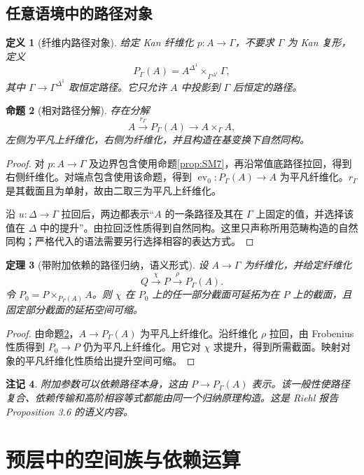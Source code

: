 \documentclass[12pt,oneside,openany,fontset=none]{ctexbook}
\theoremstyle{cn}
\newtheorem{definition}{定义}[chapter]
\newtheorem{proposition}[definition]{命题}
\newtheorem{theorem}[definition]{定理}
\newtheorem{remark}[definition]{注记}
\numberwithin{equation}{chapter}
\newcommand{\ev}{\operatorname{ev}}
\begin{document}
\section{任意语境中的路径对象}
\begin{definition}[纤维内路径对象]
给定 Kan 纤维化 $p:A\to\Gamma$，不要求 $\Gamma$ 为 Kan 复形，定义
\[
P_\Gamma(A)=A^{\Delta^1}\times_{\Gamma^{\Delta^1}}\Gamma,
\]
其中 $\Gamma\to\Gamma^{\Delta^1}$ 取恒定路径。它只允许 $A$ 中投影到 $\Gamma$ 后恒定的路径。
\end{definition}
\begin{proposition}[相对路径分解]\label{prop:relativepath}
存在分解
\[
A\xrightarrow{r_\Gamma}P_\Gamma(A)
\longrightarrow A\times_\Gamma A,
\]
左侧为平凡上纤维化，右侧为纤维化，并且构造在基变换下自然同构。
\end{proposition}
\begin{proof}
对 $p:A\to\Gamma$ 及边界包含使用命题\ref{prop:SM7}，再沿常值底路径拉回，得到右侧纤维化。对端点包含使用该命题，得到 $\ev_0:P_\Gamma(A)\to A$ 为平凡纤维化。$r_\Gamma$ 是其截面且为单射，故由二取三为平凡上纤维化。

沿 $u:\Delta\to\Gamma$ 拉回后，两边都表示“$A$ 的一条路径及其在 $\Gamma$ 上固定的值，并选择该值在 $\Delta$ 中的提升”。由拉回泛性质得到自然同构。这里只声称所用范畴构造的自然同构；严格代入的语法需要另行选择相容的表达方式。
\end{proof}
\begin{theorem}[带附加依赖的路径归纳，语义形式]
设 $A\to\Gamma$ 为纤维化，并给定纤维化
\[
Q\xrightarrow\chi P\xrightarrow\rho P_\Gamma(A).
\]
令 $P_0=P\times_{P_\Gamma(A)}A$。则 $\chi$ 在 $P_0$ 上的任一部分截面可延拓为在 $P$ 上的截面，且固定部分截面的延拓空间可缩。
\end{theorem}
\begin{proof}
由命题\ref{prop:relativepath}，$A\to P_\Gamma(A)$ 为平凡上纤维化。沿纤维化 $\rho$ 拉回，由 Frobenius 性质得到 $P_0\to P$ 仍为平凡上纤维化。用它对 $\chi$ 求提升，得到所需截面。映射对象的平凡纤维化性质给出提升空间可缩。
\end{proof}
\begin{remark}
附加参数可以依赖路径本身，这由 $P\to P_\Gamma(A)$ 表示。该一般性使路径复合、依赖传输和高阶相容等式都能由同一个归纳原理构造。这是 Riehl 报告 Proposition 3.6 的语义内容\cite{RiehlICM}。
\end{remark}



\chapter{预层中的空间族与依赖运算}
\end{document}
